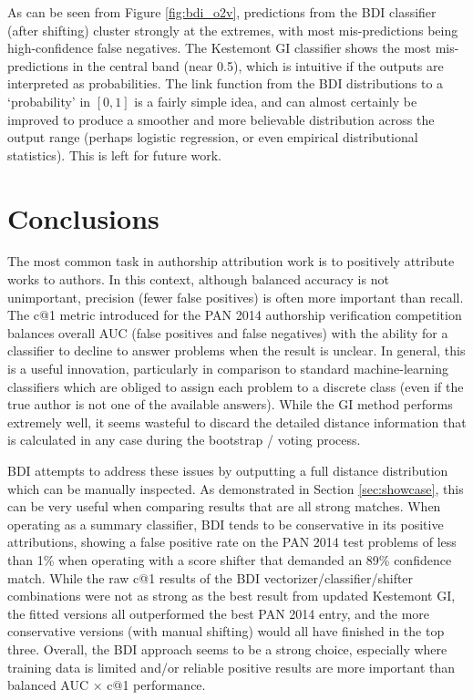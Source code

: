 \documentclass[
    hf
]{ceurart}
\begin{document}
As can be seen from Figure \ref{fig:bdi_o2v}, predictions from the BDI
classifier (after shifting) cluster strongly at the extremes, with most
mis-predictions being high-confidence false negatives. The Kestemont GI
classifier shows the most mis-predictions in the central band (near 0.5), which
is intuitive if the outputs are interpreted as probabilities. The link function
from the BDI distributions to a `probability' in $[0,1]$ is a fairly simple
idea, and can almost certainly be improved to produce a smoother and more
believable distribution across the output range (perhaps logistic regression, or
even empirical distributional statistics). This is left for future work.

\section{Conclusions}

The most common task in authorship attribution work is to positively attribute
works to authors. In this context, although balanced accuracy is not
unimportant, precision (fewer false positives) is often more important than
recall. The c@1 metric introduced for the PAN 2014 authorship verification
competition balances overall AUC (false positives and false negatives) with the
ability for a classifier to decline to answer problems when the result is
unclear. In general, this is a useful innovation, particularly in comparison to
standard machine-learning classifiers which are obliged to assign each problem
to a discrete class (even if the true author is not one of the available
answers). While the GI method performs extremely well, it seems wasteful to
discard the detailed distance information that is calculated in any case during
the bootstrap / voting process.

BDI attempts to address these issues by outputting a full distance distribution
which can be manually inspected. As demonstrated in Section \ref{sec:showcase},
this can be very useful when comparing results that are all strong matches. When
operating as a summary classifier, BDI tends to be conservative in its positive
attributions, showing a false positive rate on the PAN 2014 test problems of
less than 1\% when operating with a score shifter that demanded an 89\%
confidence match. While the raw c@1 results of the BDI
vectorizer/classifier/shifter combinations were not as strong as the best result
from updated Kestemont GI, the fitted versions all outperformed the best PAN
2014 entry, and the more conservative versions (with manual shifting) would all
have finished in the top three. Overall, the BDI approach seems to be a strong
choice, especially where training data is limited and/or reliable positive
results are more important than balanced AUC $\times$ c@1 performance.
\end{document}
